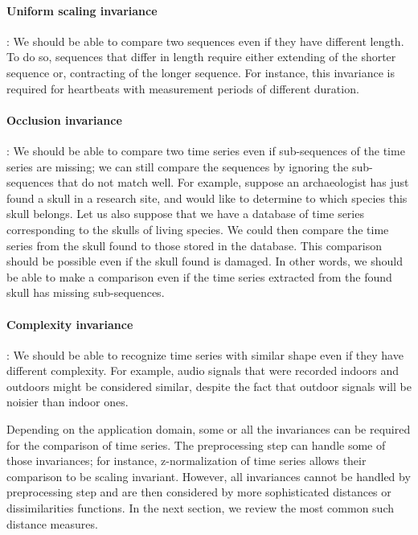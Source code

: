 \paragraph{Uniform scaling invariance}: We should be able to compare two sequences even if they have different length. To do so, sequences that differ in length require either extending of the shorter sequence or, contracting of the longer sequence. For instance, this invariance is required for heartbeats with measurement periods of different duration.  

\paragraph{Occlusion invariance} : We should be able to compare two time series even if sub-sequences of the time series are missing; we can still compare the sequences by ignoring the sub-sequences that do not match well.  For example, suppose an archaeologist has just found a skull in a research site, and  would like to determine to which species this skull belongs. Let us also suppose that we have a database of time series corresponding to the skulls of living species. We could then compare the time series from the skull found to those stored in the database. This comparison should be possible even if the skull found is damaged. In other words, we should be able to make a comparison even if the time series extracted from the found skull has missing sub-sequences.

\paragraph{Complexity invariance}: We should be able to recognize time series with similar shape even if they have different complexity.  For example, audio signals that were recorded indoors and outdoors might be considered similar, despite the fact that outdoor signals will be noisier than indoor ones. 




Depending on the application domain, some or all the invariances can be required for the comparison of time series. The preprocessing step can handle some of those invariances; for instance, z-normalization of time series allows their comparison to be scaling invariant. However, all invariances cannot be handled by preprocessing step and are then considered by more sophisticated distances or dissimilarities functions. In the next section, we review the most common such distance measures.





